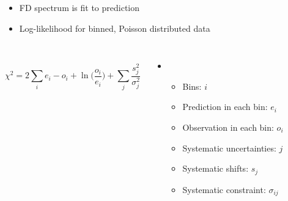 \documentclass[10pt,professionalfonts,xcolor=table]{beamer}
\begin{document}
\begin{frame}
\begin{itemize}
\item FD spectrum is fit to prediction
\item Log-likelihood for binned, Poisson distributed data
\end{itemize}
\begin{columns}[c]
~
\begin{equation*}
\chi^2 = 2 \sum_i e_i - o_i + \ln \big (\frac{o_i}{e_i} \big)
+ \sum_j \frac{s_j^2}{\sigma_j^2}
\end{equation*}
  \begin{itemize}
  \item[] ~
  \vspace{-15pt}
  \begin{itemize}
  \item Bins: $i$
  \item Prediction in each bin: $e_i$
  \item Observation in each bin: $o_i$
  \item Systematic uncertainties: $j$
  \item Systematic shifts: $s_j$
  \item Systematic constraint: $\sigma_{ij}$
  \end{itemize}
  \end{itemize}
\end{columns}
\end{frame}
\end{document}
